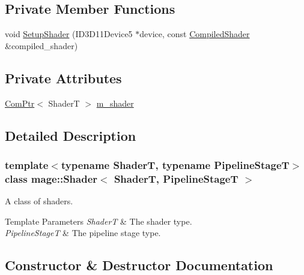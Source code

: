 \subsection*{Private Member Functions}
\begin{DoxyCompactItemize}
\item 
void \hyperlink{classmage_1_1_shader_a6328b035008e6c4ee957649f15f2c6b1}{Setup\+Shader} (I\+D3\+D11\+Device5 $\ast$device, const \hyperlink{structmage_1_1_compiled_shader}{Compiled\+Shader} \&compiled\+\_\+shader)
\end{DoxyCompactItemize}
\subsection*{Private Attributes}
\begin{DoxyCompactItemize}
\item 
\hyperlink{namespacemage_ae74f374780900893caa5555d1031fd79}{Com\+Ptr}$<$ ShaderT $>$ \hyperlink{classmage_1_1_shader_ac63260bdb25648451ddc1ee09d67c061}{m\+\_\+shader}
\end{DoxyCompactItemize}


\subsection{Detailed Description}
\subsubsection*{template$<$typename ShaderT, typename Pipeline\+StageT$>$\newline
class mage\+::\+Shader$<$ Shader\+T, Pipeline\+Stage\+T $>$}

A class of shaders.


\begin{DoxyTemplParams}{Template Parameters}
{\em ShaderT} & The shader type. \\
\hline
{\em Pipeline\+StageT} & The pipeline stage type. \\
\hline
\end{DoxyTemplParams}


\subsection{Constructor \& Destructor Documentation}
\hypertarget{classmage_1_1_shader_a70caa62e6ea79bd63e2d825850c4d6dc}{}\label{classmage_1_1_shader_a70caa62e6ea79bd63e2d825850c4d6dc} 

